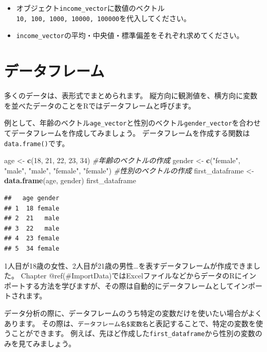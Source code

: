 \documentclass[]{book}
\newenvironment{Shaded}{\begin{snugshade}}{\end{snugshade}}
\newcommand{\KeywordTok}[1]{\textcolor[rgb]{0.13,0.29,0.53}{\textbf{#1}}}
\newcommand{\DecValTok}[1]{\textcolor[rgb]{0.00,0.00,0.81}{#1}}
\newcommand{\StringTok}[1]{\textcolor[rgb]{0.31,0.60,0.02}{#1}}
\newcommand{\CommentTok}[1]{\textcolor[rgb]{0.56,0.35,0.01}{\textit{#1}}}
\newcommand{\NormalTok}[1]{#1}
\providecommand{\tightlist}{%
  \setlength{\itemsep}{0pt}\setlength{\parskip}{0pt}}
\begin{document}
\begin{itemize}
\tightlist
\item
  オブジェクト\texttt{income\_vector}に数値のベクトル\texttt{10,\ 100,\ 1000,\ 10000,\ 100000}を代入してください。
\item
  \texttt{income\_vector}の平均・中央値・標準偏差をそれぞれ求めてください。
\end{itemize}

\section{データフレーム}\label{ux30c7ux30fcux30bfux30d5ux30ecux30fcux30e0}

多くのデータは、表形式でまとめられます。
縦方向に観測値を、横方向に変数を並べたデータのことをRではデータフレームと呼びます。

例として、年齢のベクトル\texttt{age\_vector}と性別のベクトル\texttt{gender\_vector}を合わせてデータフレームを作成してみましょう。
データフレームを作成する関数は\texttt{data.frame()}です。

\begin{Shaded}
\begin{Highlighting}[]
\NormalTok{age <-}\StringTok{ }\KeywordTok{c}\NormalTok{(}\DecValTok{18}\NormalTok{, }\DecValTok{21}\NormalTok{, }\DecValTok{22}\NormalTok{, }\DecValTok{23}\NormalTok{, }\DecValTok{34}\NormalTok{) }\CommentTok{#年齢のベクトルの作成}
\NormalTok{gender <-}\StringTok{ }\KeywordTok{c}\NormalTok{(}\StringTok{"female"}\NormalTok{, }\StringTok{"male"}\NormalTok{, }\StringTok{"male"}\NormalTok{, }\StringTok{"female"}\NormalTok{, }\StringTok{"female"}\NormalTok{) }\CommentTok{#性別のベクトルの作成}
\NormalTok{first_dataframe <-}\StringTok{ }\KeywordTok{data.frame}\NormalTok{(age, gender)}
\NormalTok{first_dataframe}
\end{Highlighting}
\end{Shaded}

\begin{verbatim}
##   age gender
## 1  18 female
## 2  21   male
## 3  22   male
## 4  23 female
## 5  34 female
\end{verbatim}

1人目が18歳の女性、2人目が21歳の男性\ldots{}を表すデータフレームが作成できました。
Chapter
@ref(\#ImportData)ではExcelファイルなどからデータのRにインポートする方法を学びますが、その際は自動的にデータフレームとしてインポートされます。

データ分析の際に、データフレームのうち特定の変数だけを使いたい場合がよくあります。
その際は、\texttt{データフレーム名\$変数名}と表記することで、特定の変数を使うことができます。
例えば、先ほど作成した\texttt{first\_dataframe}から性別の変数のみを見てみましょう。
\end{document}
